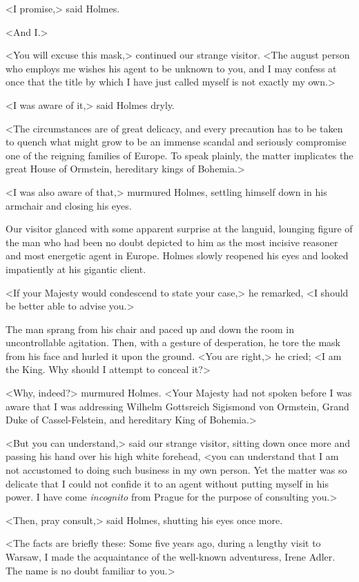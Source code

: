 <I promise,> said Holmes.

<And I\@.>

<You will excuse this mask,> continued our strange visitor. <The august person who employs me wishes his agent to be unknown to you, and I may confess at once that the title by which I have just called myself is not exactly my own.>

<I was aware of it,> said Holmes dryly.

<The circumstances are of great delicacy, and every precaution has to be taken to quench what might grow to be an immense scandal and seriously compromise one of the reigning families of Europe. To speak plainly, the matter implicates the great House of Ormstein, hereditary kings of Bohemia.>

<I was also aware of that,> murmured Holmes, settling himself down in his armchair and closing his eyes.

Our visitor glanced with some apparent surprise at the languid, lounging figure of the man who had been no doubt depicted to him as the most incisive reasoner and most energetic agent in Europe. Holmes slowly reopened his eyes and looked impatiently at his gigantic client.

<If your Majesty would condescend to state your case,> he remarked, <I should be better able to advise you.>

The man sprang from his chair and paced up and down the room in uncontrollable agitation. Then, with a gesture of desperation, he tore the mask from his face and hurled it upon the ground. <You are right,> he cried; <I am the King. Why should I attempt to conceal it?>

<Why, indeed?> murmured Holmes. <Your Majesty had not spoken before I was aware that I was addressing Wilhelm Gottsreich Sigismond von Ormstein, Grand Duke of Cassel-Felstein, and hereditary King of Bohemia.>

<But you can understand,> said our strange visitor, sitting down once more and passing his hand over his high white forehead, <you can understand that I am not accustomed to doing such business in my own person. Yet the matter was so delicate that I could not confide it to an agent without putting myself in his power. I have come \textit{incognito} from Prague for the purpose of consulting you.>

<Then, pray consult,> said Holmes, shutting his eyes once more.

<The facts are briefly these: Some five years ago, during a lengthy visit to Warsaw, I made the acquaintance of the well-known adventuress, Irene Adler. The name is no doubt familiar to you.>

